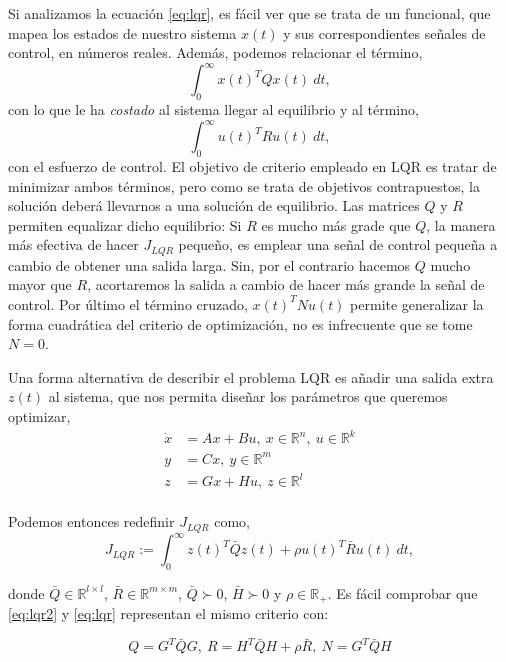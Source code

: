 Si analizamos la ecuación \ref{eq:lqr}, es fácil ver que se trata de un funcional, que mapea los estados de nuestro sistema $x(t)$ y sus correspondientes señales de control, en números reales. Además, podemos relacionar el término,
\begin{equation*}
\int_0^{\infty}x(t)^TQx(t)\ dt,
\end{equation*}
con lo que le ha \emph{costado} al sistema llegar al equilibrio y al término,
\begin{equation*}
\int_0^{\infty}u(t)^TRu(t)\ dt,
\end{equation*} 
con el esfuerzo de control. El objetivo de criterio empleado en LQR es tratar de minimizar ambos términos, pero como se trata de objetivos contrapuestos, la solución deberá llevarnos a una solución de equilibrio. Las matrices $Q$ y $R$ permiten equalizar dicho equilibrio: Si  $R$ es mucho más grade que $Q$, la manera más efectiva de hacer $J_{LQR}$ pequeño, es emplear una señal de control pequeña a cambio de obtener una salida larga. Sin, por el contrario hacemos $Q$ mucho mayor que $R$, acortaremos la salida a cambio de hacer más grande la señal de control. Por último el término cruzado, $x(t)^TNu(t)$ permite generalizar la forma cuadrática del criterio de optimización, no es infrecuente que se tome $N=0$. 

Una forma alternativa de describir el problema LQR es añadir una salida extra $z(t)$ al sistema, que nos permita diseñar los parámetros que queremos optimizar,
\begin{align*} 
\dot{x} &= Ax+Bu,\ x \in \mathbb{R}^n, \ u\in \mathbb{R}^k\\
y&=Cx,\ y \in \mathbb{R}^m\\
z &= Gx+Hu,\ z \in \mathbb{R}^l\\
\end{align*}

Podemos entonces redefinir $J_{LQR} $ como,
\begin{equation}\label{eq:lqr2}
J_{LQR} := \int_0^{\infty}z(t)^T \bar{Q}z(t)+\rho u(t)^T \bar{R}u(t)\  dt,
\end{equation}

 donde $\bar{Q}  \in \mathbb{R}^{l\times l}$,  $\bar{R} \in \mathbb{R}^{m\times m}$, $\bar{Q}\succ 0 $, $\bar{H}\succ 0 $ y $\rho \in \mathbb{R}_+$. Es fácil comprobar que \ref{eq:lqr2} y \ref{eq:lqr} representan el mismo criterio con:

 \begin{equation*}
 Q = G^T\bar{Q}G,\ R = H^T\bar{Q}H + \rho\bar{R}, \ N = G^T\bar{Q}H 
\end{equation*}   

